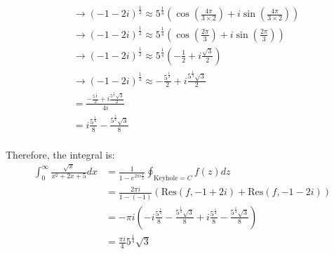 \begin{example}
\begin{align*}
                             & \rightarrow (-1-2i)^{\frac{1}{2}} \approx 5^\frac{1}{4}(\cos(\frac{4\pi}{3\times 2}) + i\sin(\frac{4\pi}{3\times 2}))              \\
                             & \rightarrow (-1-2i)^{\frac{1}{2}} \approx 5^\frac{1}{4}(\cos(\frac{2\pi}{3}) + i\sin(\frac{2\pi}{3}))                              \\
                             & \rightarrow (-1-2i)^{\frac{1}{2}} \approx 5^\frac{1}{4}(-\frac{1}{2} + i\frac{\sqrt{3}}{2})                                        \\
                             & \rightarrow (-1-2i)^{\frac{1}{2}} \approx -\frac{5^\frac{1}{4}}{2} + i\frac{5^\frac{1}{4}\sqrt{3}}{2}                              \\
                             & = \frac{-\frac{5^\frac{1}{4}}{2} + i\frac{5^\frac{1}{4}\sqrt{3}}{2}}{4i}                                                           \\
                             & = i\frac{5^\frac{1}{4}}8 - \frac{5^\frac{1}{4}\sqrt{3}}{8}                                                                         \\
    \end{align*}

    Therefore, the integral is:
    \begin{align}
        \int_0^\infty\frac{\sqrt{x}}{x^2+2x+5}dx & =  \frac{1}{1 - e^{2\pi i \frac{1}{2}}}\oint_{\text{Keyhole} = C} f(z)dz                                                       \\
                                                 & = \frac{2\pi i}{1 - (-1)}(\text{Res}(f, -1+2i) + \text{Res}(f, -1-2i))                                                         \\
                                                 & = -\pi i(-i\frac{5^\frac{1}{4}}8 - \frac{5^\frac{1}{4}\sqrt{3}}{8} + i\frac{5^\frac{1}{4}}8 - \frac{5^\frac{1}{4}\sqrt{3}}{8}) \\
                                                 & = \frac{\pi i}{4}5^\frac{1}{4}\sqrt3
    \end{align}
\end{example}

